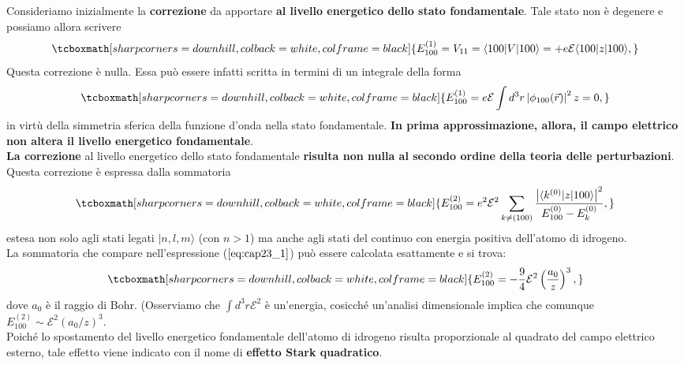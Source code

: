 Consideriamo inizialmente la \textbf{correzione} da apportare \textbf{al livello energetico dello stato fondamentale}. Tale stato non è degenere e possiamo allora scrivere
	\begin{equation}
		\tcboxmath[sharp corners=downhill, colback=white, colframe=black]{
			E^{(1)}_{100}=V_{11}=\langle100| V |100\rangle =+e\mathcal{E}\langle 100 | z |100 \rangle,
			}
	\end{equation}
Questa correzione è nulla. Essa può essere infatti scritta in termini di un integrale della forma
	\begin{equation}
		\tcboxmath[sharp corners=downhill, colback=white, colframe=black]{
			E^{(1)}_{100}=e\mathcal{E} \int d^3r \left|\phi_{100}(\vec{r})\right|^2 z=0,
			}
	\end{equation}
in virtù della simmetria sferica della funzione d'onda nella stato fondamentale. \textbf{In prima approssimazione, allora, il campo elettrico non altera il livello energetico fondamentale}.\\

\textbf{La correzione} al livello energetico dello stato fondamentale \textbf{risulta non nulla al secondo ordine della teoria delle perturbazioni}. Questa correzione è espressa dalla sommatoria
	\begin{equation}
	\label{eq:cap23_1}
		\tcboxmath[sharp corners=downhill, colback=white, colframe=black]{
			E^{(2)}_{100}=e^2 \mathcal{E}^2 \sum_{k\neq(100)}\frac{\left| \langle k^{(0)} | z |100 \rangle \right|^2}{E^{(0)}_{100}-E^{(0)}_{k}},
			}
	\end{equation}
estesa non solo agli stati legati $|n,l,m \rangle$ (con $n>1$) ma anche agli stati del continuo con energia positiva dell'atomo di idrogeno.\\

La sommatoria che compare nell'espressione ($\ref{eq:cap23_1}$) può essere calcolata esattamente e si trova:
	\begin{equation}
		\tcboxmath[sharp corners=downhill, colback=white, colframe=black]{
			E^{(2)}_{100}=-\frac{9}{4} \mathcal{E}^2 \left( \frac{a_0}{z} \right)^3,
			}
	\end{equation}
dove $a_0$ è il raggio di Bohr. (Osserviamo che $\int d^3r \mathcal{E}^2$ è un'energia, cosicché un'analisi dimensionale implica che comunque $E^{(2)}_{100}\sim\mathcal{E}^2\left( a_0/z \right)^3 $.\\

Poiché lo spostamento del livello energetico fondamentale dell'atomo di idrogeno risulta proporzionale al quadrato del campo elettrico esterno, tale effetto viene indicato con il nome di \textbf{effetto Stark quadratico}.\\

